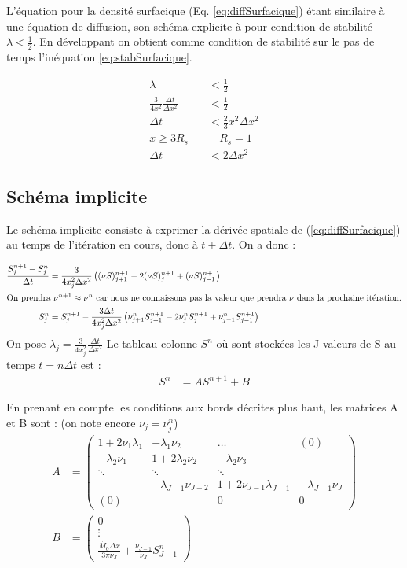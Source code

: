 \documentclass[a4paper,12pt]{article}
\begin{document}
L'équation pour la densité surfacique (Eq. \ref{eq:diffSurfacique}) étant similaire à une équation de diffusion, son schéma explicite à pour condition de stabilité $\lambda < \frac{1}{2}$. En développant on obtient comme condition de stabilité sur le pas de temps l'inéquation \ref{eq:stabSurfacique}.

\begin{align}
	\lambda &< \frac{1}{2} \\
	\frac{3}{4 x^2} \frac{\Delta t}{\Delta x^2} &< \frac{1}{2} \\
	\Delta t &< \frac{2}{3} x^2 \Delta x^2 \\
	x \geq 3 R_s \quad & \quad R_s = 1 \\
	\Delta t &< 2 \Delta x^2 \label{eq:stabSurfacique}	
\end{align}

\subsection{Schéma implicite}

Le schéma implicite consiste à exprimer la dérivée spatiale de (\ref{eq:diffSurfacique}) au temps de l'itération en cours, donc à $t+\Delta t$. On a donc :

\begin{align}
 	\frac{S^{n+1}_j - S^n_j}{\Delta t} &= \frac{3}{4x_j^2\Delta x^2}\left((\nu S)^{n+1}_{j+1} - 2(\nu S)_j^{n+1} + (\nu S)^{n+1}_{j-1}\right)\\
	\intertext{On prendra $\nu^{n+1} \approx \nu^n$ car nous ne connaissons pas la valeur que prendra $\nu$ dans la prochaine itération.}
	S^n_j &= S_j^{n+1} - \frac{3\Delta t}{4x_j^2\Delta x^2}\left(\nu^n_{j+1}S^{n+1}_{j+1} - 2\nu^n_j S_j^{n+1} + \nu^n_{j-1} S^{n+1}_{j-1}\right)\\
\end{align}
On pose $\lambda_j = \frac{3}{4x_j^2}\frac{\Delta t}{\Delta x^2}$
Le tableau colonne $S^n$ où sont stockées les J valeurs de S au temps $t=n\Delta t$ est :
\begin{align}
S^n &= AS^{n+1} + B
\end{align}

En prenant en compte les conditions aux bords décrites plus haut, les matrices A et B sont : (on note encore $\nu_j = \nu^n_j$)
\begin{align}
A&= \begin{pmatrix} 1 + 2\nu_1\lambda_1& -\lambda_1\nu_2 & \ldots & (0) \\
	-\lambda_2\nu_1 & 1 + 2\lambda_2\nu_2 &- \lambda_2\nu_3 & \\
	 \ddots& \ddots& \ddots &\\
	  &- \lambda_{J-1}\nu_{J-2} & 1 + 2\nu_{J-1}\lambda_{J-1} &- \lambda_{J-1}\nu_{J}\\
	  (0) &  & 0 & 0
\end{pmatrix}\\
 B &= \begin{pmatrix}  0\\
	\vdots\\
	\frac{\dot{M_0}\Delta x}{3\pi\nu_J} + \frac{\nu_{J-1}}{\nu_J}S^n_{J-1}
\end{pmatrix}
\end{align}
\end{document}
